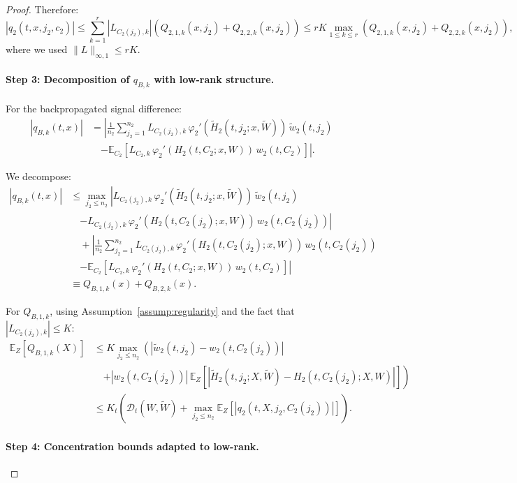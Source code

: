 \documentclass[nohyperref]{article}
\theoremstyle{plain}
\theoremstyle{definition}
\theoremstyle{remark}
\begin{document}
\begin{proof}
Therefore:
\[
|q_2(t, x, j_2, c_2)| \le \sum_{k=1}^r |L_{C_2(j_2),k}|(Q_{2,1,k}(x, j_2) + Q_{2,2,k}(x, j_2)) \le rK\max_{1 \le k \le r}(Q_{2,1,k}(x, j_2) + Q_{2,2,k}(x, j_2)),
\]
where we used $\|L\|_{\infty,1} \le rK$.

\paragraph*{Step 3: Decomposition of $q_{B,k}$ with low-rank structure.}

For the backpropagated signal difference:
\begin{align*}
|q_{B,k}(t, x)| &= \left|\frac{1}{n_2}\sum_{j_2=1}^{n_2} L_{C_2(j_2),k}\,\varphi_2'(\tilde{H}_2(t, j_2; x, \tilde{W}))\,\tilde{w}_2(t, j_2)\right.\\
&\quad\left. - \mathbb{E}_{C_2}[L_{C_2,k}\,\varphi_2'(H_2(t, C_2; x, W))\,w_2(t, C_2)]\right|.
\end{align*}

We decompose:
\begin{align*}
|q_{B,k}(t, x)| &\le \max_{j_2 \le n_2}\left|L_{C_2(j_2),k}\,\varphi_2'(\tilde{H}_2(t, j_2; x, \tilde{W}))\,\tilde{w}_2(t, j_2)\right.\\
&\quad\left. - L_{C_2(j_2),k}\,\varphi_2'(H_2(t, C_2(j_2); x, W))\,w_2(t, C_2(j_2))\right|\\
&\quad + \left|\frac{1}{n_2}\sum_{j_2=1}^{n_2} L_{C_2(j_2),k}\,\varphi_2'(H_2(t, C_2(j_2); x, W))\,w_2(t, C_2(j_2))\right.\\
&\quad\left. - \mathbb{E}_{C_2}[L_{C_2,k}\,\varphi_2'(H_2(t, C_2; x, W))\,w_2(t, C_2)]\right|\\
&\equiv Q_{B,1,k}(x) + Q_{B,2,k}(x).
\end{align*}

For $Q_{B,1,k}$, using Assumption~\ref{assump:regularity} and the fact that $|L_{C_2(j_2),k}| \le K$:
\begin{align*}
\mathbb{E}_Z[Q_{B,1,k}(X)] &\le K\max_{j_2 \le n_2}\left(|\tilde{w}_2(t, j_2) - w_2(t, C_2(j_2))|\right.\\
&\quad\left. + |w_2(t, C_2(j_2))|\,\mathbb{E}_Z[|\tilde{H}_2(t, j_2; X, \tilde{W}) - H_2(t, C_2(j_2); X, W)|]\right)\\
&\le K_t\left(\mathscr{D}_t(W, \tilde{W}) + \max_{j_2 \le n_2}\mathbb{E}_Z[|q_2(t, X, j_2, C_2(j_2))|]\right).
\end{align*}

\paragraph*{Step 4: Concentration bounds adapted to low-rank.}


\end{proof}
\end{document}
